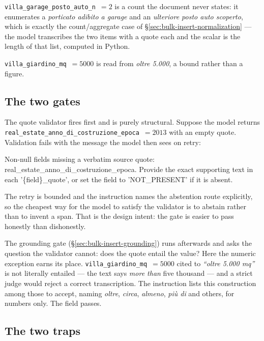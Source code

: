 \texttt{villa\_garage\_posto\_auto\_n}~$=2$ is a count the document never states: it enumerates a \emph{porticato adibito a garage} and an \emph{ulteriore posto auto scoperto}, which is exactly the count/aggregate case of \S\ref{sec:bulk-insert-normalization} --- the model transcribes the two items with a quote each and the scalar is the length of that list, computed in Python. 

\texttt{villa\_giardino\_mq}~$=5000$ is read from \emph{oltre 5.000}, a bound rather than a figure.

\subsection{The two gates}
\label{sec:examples-gates}

The quote validator fires first and is purely structural. Suppose the model returns \texttt{real\_estate\_anno\_di\_costruzione\_epoca}~$=2013$ with an empty quote. Validation fails with the message the model then sees on retry:

\vspace{0.5cm}

\footnotesize{\ttfamily
Non-null fields missing a verbatim source quote: real\_estate\_anno\_di\_costruzione\_epoca. Provide the exact supporting text in each '\{field\}\_quote', or set the field to 'NOT\_PRESENT' if it is absent.}

\vspace{0.5cm}

The retry is bounded and the instruction names the abstention route explicitly, so the cheapest way for the model to satisfy the validator is to abstain rather than to invent a span. That is the design intent: the gate is easier to pass honestly than dishonestly.

The grounding gate (\S\ref{sec:bulk-insert-grounding}) runs afterwards and asks the question the validator cannot: does the quote entail the value? Here the numeric exception earns its place. \texttt{villa\_giardino\_mq}~$=5000$ cited to \emph{``oltre 5.000 mq''} is not literally entailed --- the text says \emph{more than} five thousand --- and a strict judge would reject a correct transcription. The instruction lists this construction among those to accept, naming \emph{oltre}, \emph{circa}, \emph{almeno}, \emph{più di} and others, for numbers only. The field passes.

\subsection{The two traps}
\label{sec:examples-traps}

